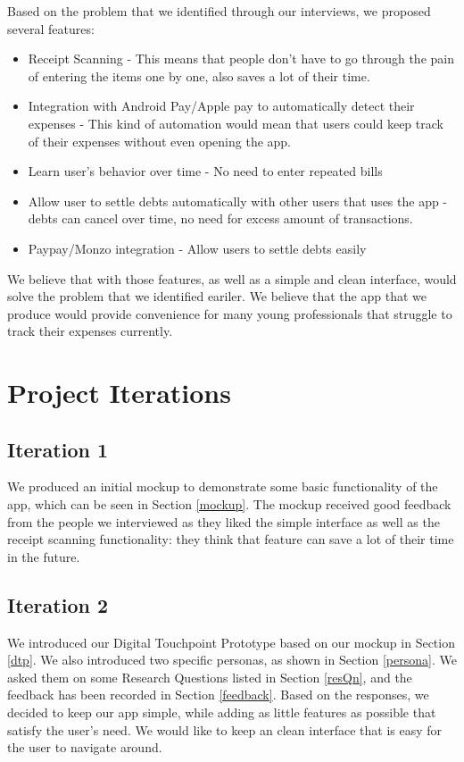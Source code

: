 \documentclass[a4wide, 11pt]{article}
\begin{document}
Based on the problem that we identified through our interviews, we proposed several features:
\begin{itemize}
\item Receipt Scanning - This means that people don't have to go through the pain of entering the items one by one, also saves a lot of their time.
\item Integration with Android Pay/Apple pay to automatically detect their expenses - This kind of automation would mean that users could keep track of their expenses without even opening the app.
\item Learn user's behavior over time - No need to enter repeated bills
\item Allow user to settle debts automatically with other users that uses the app - debts can cancel over time, no need for excess amount of transactions.
\item Paypay/Monzo integration - Allow users to settle debts easily
\end{itemize} 

We believe that with those features, as well as a simple and clean interface, would solve the problem that we identified eariler. We believe that the app that we produce would provide convenience for many young professionals that struggle to track their expenses currently.

\section{Project Iterations}

\subsection{Iteration 1}

We produced an initial mockup to demonstrate some basic functionality of the app, which can be seen in Section \ref{mockup}. The mockup received good feedback from the people we interviewed as they liked the simple interface as well as the receipt scanning functionality: they think that feature can save a lot of their time in the future.

\subsection{Iteration 2}
We introduced our Digital Touchpoint Prototype based on our mockup in Section \ref{dtp}. We also introduced two specific personas, as shown in Section \ref{persona}. We asked them on some Research Questions listed in Section \ref{resQn}, and the feedback has been recorded in Section \ref{feedback}. 
Based on the responses, we decided to keep our app simple, while adding as little features as possible that satisfy the user's need. We would like to keep an clean interface that is easy for the user to navigate around.
\end{document}
